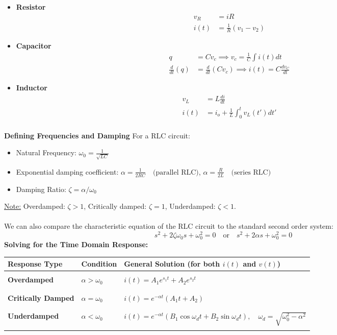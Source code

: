 \documentclass[12pt]{article}
\begin{document}
\begin{itemize}
    \item \textbf{Resistor}
    \[
    \begin{aligned}
        v_R &= iR \\
        i(t) &= \frac{1}{R}(v_1 - v_2)
    \end{aligned}
    \]
    \item \textbf{Capacitor}
    \[
    \begin{aligned}
        q &= Cv_c \implies v_c = \frac{1}{C}\int i(t) dt\\
        \frac{d}{dt}(q) &= \frac{d}{dt}(Cv_c) \implies  i(t) = C \frac{dv_C}{dt} 
    \end{aligned}
    \]
    \item \textbf{Inductor}
    \[
    \begin{aligned}
        v_L &= L \frac{di}{dt} \\
        i(t) &= i_o + \frac{1}{L} \int_0^t v_L(t') dt' \\
    \end{aligned}
    \]
\end{itemize}
\textbf{Defining Frequencies and Damping}
For a RLC circuit:
\begin{itemize}
    \item Natural Frequency: $\omega_0 = \frac{1}{\sqrt{LC}}$
    \item Exponential damping coefficient: $\alpha = \frac{1}{2RC}\quad \text{(parallel RLC)}$, $\alpha = \frac{R}{2L}\quad \text{(series RLC)}$
    \item Damping Ratio: $\zeta = \alpha/\omega_0$
\end{itemize}
\underline{Note:} Overdamped: $\zeta > 1$, Critically damped: $\zeta = 1$, Underdamped: $\zeta < 1$.\\\\
We can also compare the characteristic equation of the RLC circuit to the standard second order system:
\[s^2 + 2\zeta\omega_0 s+\omega_0^2 = 0\quad\text{or}\quad s^2 + 2\alpha s + \omega_0^2 = 0\]
\textbf{Solving for the Time Domain Response:}
\begin{table}[h]
\centering
\begin{tabular}{lll}
\hline
\textbf{Response Type} & \textbf{Condition} & \textbf{General Solution (for both $i(t)$ and $v(t)$)} \\ \hline
& & \\
\textbf{Overdamped} & $\alpha > \omega_0$ & $i(t) = A_1e^{s_1t} + A_2e^{s_2t}$ \\
& & \\ \hline
& & \\
\textbf{Critically Damped} & $\alpha = \omega_0$ & $i(t) = e^{-\alpha t}(A_1t + A_2)$ \\
& & \\ \hline
& & \\
\textbf{Underdamped} & $\alpha < \omega_0$ & $i(t) = e^{-\alpha t}(B_1 \cos \omega_d t + B_2 \sin \omega_d t),\quad \omega_d = \sqrt{\omega_0^2 - \alpha^2}$ \\
& & \\ \hline
\end{tabular}
\end{table}\\
\end{document}
